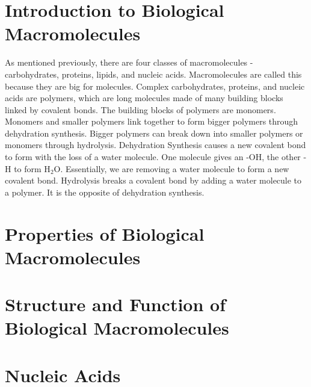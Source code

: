 \documentclass[../bio.tex]{subfiles}
\begin{document}
\section{Introduction to Biological Macromolecules}
As mentioned previously, there are four classes of macromolecules - carbohydrates, proteins, lipids, and nucleic acids. Macromolecules are called this because they are big for molecules.
\smallbreak
Complex carbohydrates, proteins, and nucleic acids are polymers, which are long molecules made of many building blocks linked by covalent bonds. The building blocks of polymers are monomers.
\smallbreak
Monomers and smaller polymers link together to form bigger polymers through dehydration synthesis. Bigger polymers can break down into smaller polymers or monomers through hydrolysis. 
\smallbreak
Dehydration Synthesis causes a new covalent bond to form with the loss of a water molecule. One molecule gives an -OH, the other -H to form H$_2$O. Essentially, we are removing a water molecule to form a new covalent bond.
\smallbreak
Hydrolysis breaks a covalent bond by adding a water molecule to a polymer. It is the opposite of dehydration synthesis.
\section{Properties of Biological Macromolecules}
\section{Structure and Function of Biological Macromolecules}
\section{Nucleic Acids}
\end{document}
